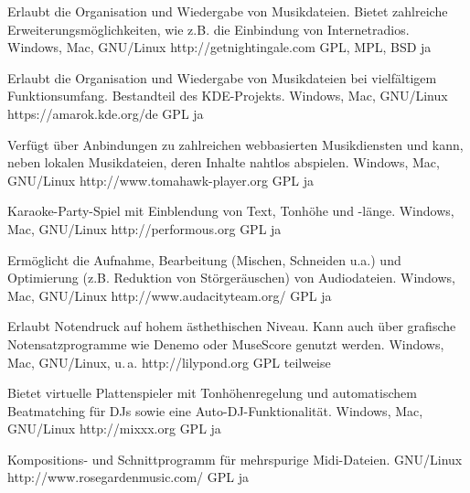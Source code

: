 





{Erlaubt die Organisation und Wiedergabe von Musikdateien. Bietet zahlreiche Erweiterungsmöglichkeiten, wie z.B. die Einbindung von Internetradios.}
{Windows, Mac, GNU/Linux}
{http://getnightingale.com}
{GPL, MPL, BSD}
{ja}

{Erlaubt die Organisation und Wiedergabe von Musikdateien bei vielfältigem Funktionsumfang. Bestandteil des KDE-Projekts.}
{Windows, Mac, GNU/Linux}
{https://amarok.kde.org/de}
{GPL}
{ja}

{Verfügt über Anbindungen zu zahlreichen webbasierten Musikdiensten und kann, neben lokalen Musikdateien, deren Inhalte nahtlos abspielen.}
{Windows, Mac, GNU/Linux}
{http://www.tomahawk-player.org}  %
{GPL}
{ja}

{Karaoke-Party-Spiel mit Einblendung von Text, Tonhöhe und -länge.}
{Windows, Mac, GNU/Linux}
{http://performous.org}
{GPL}
{ja}


{Ermöglicht die Aufnahme, Bearbeitung (Mischen, Schneiden u.a.) und Optimierung (z.B. Reduktion von Störgeräuschen) von Audiodateien.}
{Windows, Mac, GNU/Linux}
{http://www.audacityteam.org/}
{GPL}
{ja}

{Erlaubt Notendruck auf hohem ästhethischen Niveau. Kann auch über grafische Notensatzprogramme wie Denemo oder MuseScore genutzt werden.}
{Windows, Mac, GNU/Linux, u.\,a.}
{http://lilypond.org}
{GPL}
{teilweise}

{Bietet virtuelle Plattenspieler mit Tonhöhenregelung und automatischem Beatmatching für DJs sowie eine Auto-DJ-Funktionalität.}
{Windows, Mac, GNU/Linux}
{http://mixxx.org}
{GPL}
{ja}

{Kompositions- und Schnittprogramm für mehrspurige Midi-Dateien.}
{GNU/Linux}
{http://www.rosegardenmusic.com/}
{GPL}
{ja}

\backpage


